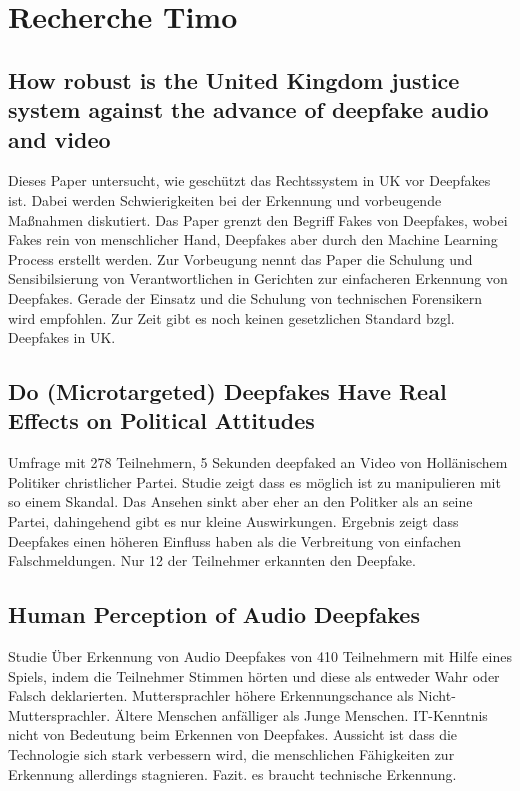 \section{Recherche Timo}
\subsection{How robust is the United Kingdom justice system against the advance of deepfake audio and video}
Dieses Paper untersucht, wie geschützt das Rechtssystem in UK vor Deepfakes ist.
Dabei werden Schwierigkeiten bei der Erkennung und vorbeugende Maßnahmen diskutiert.
Das Paper grenzt den Begriff Fakes von Deepfakes, wobei Fakes rein von menschlicher Hand, Deepfakes aber durch den Machine Learning Process erstellt werden.
Zur Vorbeugung nennt das Paper die Schulung und Sensibilsierung von Verantwortlichen in Gerichten zur einfacheren Erkennung von Deepfakes.
Gerade der Einsatz und die Schulung von technischen Forensikern wird empfohlen.
Zur Zeit gibt es noch keinen gesetzlichen Standard bzgl. Deepfakes in UK.\cite{Jones2022}

\subsection{Do (Microtargeted) Deepfakes Have Real Effects on Political Attitudes}
Umfrage mit 278 Teilnehmern, 5 Sekunden deepfaked an Video von Hollänischem Politiker christlicher Partei.
Studie zeigt dass es möglich ist zu manipulieren mit so einem Skandal. 
Das Ansehen sinkt aber eher an den Politker als an seine Partei, dahingehend gibt es nur kleine Auswirkungen.
Ergebnis zeigt dass Deepfakes einen höheren Einfluss haben als die Verbreitung von einfachen Falschmeldungen.
Nur 12 der Teilnehmer erkannten den Deepfake.\cite{Dobber2020}

\subsection{Human Perception of Audio Deepfakes}
Studie Über Erkennung von Audio Deepfakes von 410 Teilnehmern mit Hilfe eines Spiels, indem die Teilnehmer Stimmen hörten und diese als entweder Wahr oder Falsch deklarierten.
Muttersprachler höhere Erkennungschance als Nicht-Muttersprachler.
Ältere Menschen anfälliger als Junge Menschen.
IT-Kenntnis nicht von Bedeutung beim Erkennen von Deepfakes.
Aussicht ist dass die Technologie sich stark verbessern wird, die menschlichen Fähigkeiten zur Erkennung allerdings stagnieren.
Fazit. es braucht technische Erkennung. \cite{Mueller2022}

